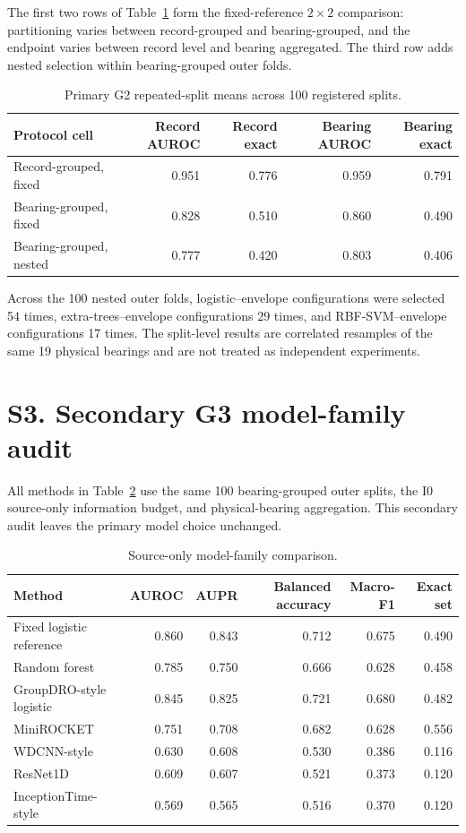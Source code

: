 \documentclass[11pt]{article}
\begin{document}
The first two rows of Table~\ref{tab:s-g2} form the fixed-reference $2\times2$ comparison: partitioning varies between record-grouped and bearing-grouped, and the endpoint varies between record level and bearing aggregated. The third row adds nested selection within bearing-grouped outer folds.

\begin{table}[h]
\centering
\small
\caption{Primary G2 repeated-split means across 100 registered splits.}
\label{tab:s-g2}
\begin{tabular}{lrrrr}
\toprule
Protocol cell & Record AUROC & Record exact & Bearing AUROC & Bearing exact \\
\midrule
Record-grouped, fixed & 0.951 & 0.776 & 0.959 & 0.791 \\
Bearing-grouped, fixed & 0.828 & 0.510 & 0.860 & 0.490 \\
Bearing-grouped, nested & 0.777 & 0.420 & 0.803 & 0.406 \\
\bottomrule
\end{tabular}
\end{table}

Across the 100 nested outer folds, logistic--envelope configurations were selected 54 times, extra-trees--envelope configurations 29 times, and RBF-SVM--envelope configurations 17 times. The split-level results are correlated resamples of the same 19 physical bearings and are not treated as independent experiments.

\section*{S3. Secondary G3 model-family audit}

All methods in Table~\ref{tab:s-g3} use the same 100 bearing-grouped outer splits, the I0 source-only information budget, and physical-bearing aggregation. This secondary audit leaves the primary model choice unchanged.

\begin{table}[h]
\centering
\small
\caption{Source-only model-family comparison.}
\label{tab:s-g3}
\begin{tabular}{lrrrrr}
\toprule
Method & AUROC & AUPR & Balanced accuracy & Macro-F1 & Exact set \\
\midrule
Fixed logistic reference & 0.860 & 0.843 & 0.712 & 0.675 & 0.490 \\
Random forest & 0.785 & 0.750 & 0.666 & 0.628 & 0.458 \\
GroupDRO-style logistic & 0.845 & 0.825 & 0.721 & 0.680 & 0.482 \\
MiniROCKET & 0.751 & 0.708 & 0.682 & 0.628 & 0.556 \\
WDCNN-style & 0.630 & 0.608 & 0.530 & 0.386 & 0.116 \\
ResNet1D & 0.609 & 0.607 & 0.521 & 0.373 & 0.120 \\
InceptionTime-style & 0.569 & 0.565 & 0.516 & 0.370 & 0.120 \\
\bottomrule
\end{tabular}
\end{table}
\end{document}
